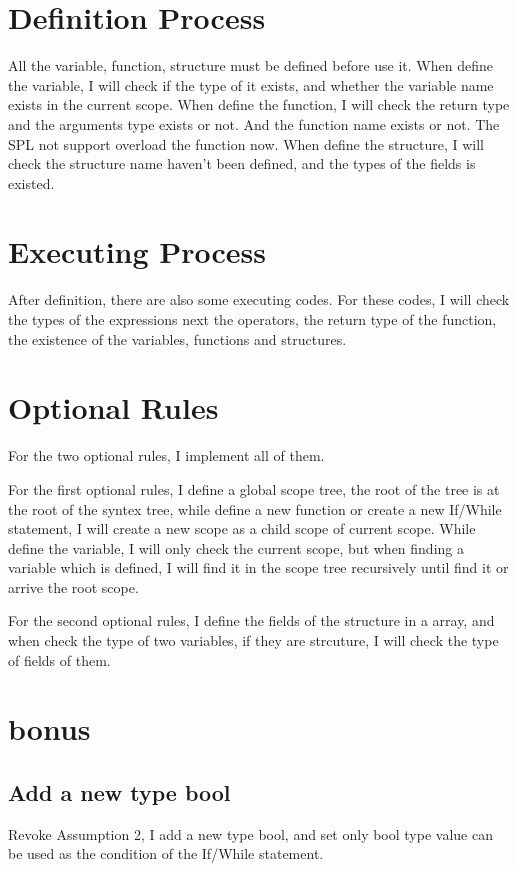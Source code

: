 \documentclass{article}
\begin{document}
    \section{Definition Process}
        All the variable, function, structure must be defined before use it. When define the variable, I will check if the type of it exists,
        and whether the variable name exists in the current scope. When define the function, I will check the return type and the arguments type exists or not.
        And the function name exists or not. The SPL not support overload the function now. When define the structure, I will check the structure name haven't been defined, and the 
        types of the fields is existed.

    \section{Executing Process}
        After definition, there are also some executing codes. For these codes, I will check the types of the expressions next the operators, 
        the return type of the function, the existence of the variables, functions and structures. 
    \section{Optional Rules}
        For the two optional rules, I implement all of them.

        For the first optional rules, I define a global scope tree, the root of the tree is at the root of the syntex tree, 
        while define a new function or create a new If/While statement, I will create a new scope as a child scope of current scope.
        While define the variable, I will only check the current scope, but when finding a variable which is defined, I will find it in the scope tree recursively until find it or arrive the root scope.

        For the second optional rules, I define the fields of the structure in a array, and when check the type of two variables, if they are strcuture, I will check the type of fields of them.

    \section{bonus}
        \subsection{Add a new type bool}
            Revoke Assumption 2, I add a new type bool, and set only bool type value can be used as the condition of the If/While statement.
        
\end{document}
